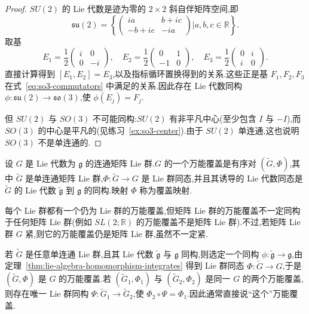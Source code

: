 {\begin{proof}
$SU(2)$ 的 Lie 代数是迹为零的 $2\times2$ 斜自伴矩阵空间,即
\[
\mathfrak{su}(2)=\left\{
\begin{pmatrix}ia&b+ic\\-b+ic&-ia\end{pmatrix}\mathrel{\Big|}a,b,c\in\mathbb R
\right\}.
\]
取基
\[
E_1=\frac12\begin{pmatrix}i&0\\0&-i\end{pmatrix},\quad
E_2=\frac12\begin{pmatrix}0&1\\-1&0\end{pmatrix},\quad
E_3=\frac12\begin{pmatrix}0&i\\i&0\end{pmatrix}.
\label{eq:su2-basis}
\]
直接计算得到 $[E_1,E_2]=E_3$,以及指标循环置换得到的关系.这些正是基 $F_1,F_2,F_3$ 在式~\eqref{eq:so3-commutators} 中满足的关系.因此存在 Lie 代数同构 $\phi:\mathfrak{su}(2)\to\mathfrak{so}(3)$,使 $\phi(E_j)=F_j$.

但 $SU(2)$ 与 $SO(3)$ 不可能同构:$SU(2)$ 有非平凡中心(至少包含 $I$ 与 $-I$),而 $SO(3)$ 的中心是平凡的(见练习~\ref{ex:so3-center}).由于 $SU(2)$ 单连通,这也说明 $SO(3)$ 不是单连通的.
\end{proof}

\begin{definition}[万能覆盖]\label{def:universal-cover-lie-group}
设 $G$ 是 Lie 代数为 $\mathfrak g$ 的连通矩阵 Lie 群.$G$ 的一个万能覆盖是有序对 $(\widetilde G,\Phi)$,其中 $\widetilde G$ 是单连通矩阵 Lie 群,$\Phi:\widetilde G\to G$ 是 Lie 群同态,并且其诱导的 Lie 代数同态是 $\widetilde G$ 的 Lie 代数 $\widetilde{\mathfrak g}$ 到 $\mathfrak g$ 的同构.映射 $\Phi$ 称为覆盖映射.
\end{definition}

每个 Lie 群都有一个仍为 Lie 群的万能覆盖,但矩阵 Lie 群的万能覆盖不一定同构于任何矩阵 Lie 群(例如 $SL(2;\mathbb R)$ 的万能覆盖不是矩阵 Lie 群).不过,若矩阵 Lie 群 $G$ 紧,则它的万能覆盖仍是矩阵 Lie 群,虽然不一定紧.

若 $\widetilde G$ 是任意单连通 Lie 群,且其 Lie 代数 $\widetilde{\mathfrak g}$ 与 $\mathfrak g$ 同构,则选定一个同构 $\phi:\widetilde{\mathfrak g}\to\mathfrak g$,由定理~\ref{thm:lie-algebra-homomorphism-integrates} 得到 Lie 群同态 $\Phi:\widetilde G\to G$,于是 $(\widetilde G,\Phi)$ 是 $G$ 的万能覆盖.若 $(\widetilde G_1,\Phi_1)$ 与 $(\widetilde G_2,\Phi_2)$ 是同一 $G$ 的两个万能覆盖,则存在唯一 Lie 群同构 $\Psi:\widetilde G_1\to\widetilde G_2$,使 $\Phi_2\circ\Psi=\Phi_1$.因此通常直接说“这个”万能覆盖.

}
